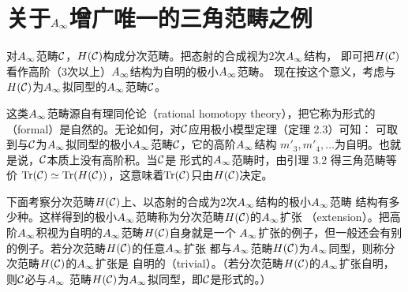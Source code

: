 
\section{关于\texorpdfstring{$A_{\infty}$}{A∞}增广唯一的三角范畴之例}
\label{sec:c06}

对$A_{\infty}$范畴$\mathcal{C}$，$H(\mathcal{C})$构成分次范畴。把态射的合成视为$2$次$A_{\infty}$结构，
即可把$H(\mathcal{C})$看作高阶（$3$次以上）$A_{\infty}$结构为自明的极小$A_{\infty}$范畴。
现在按这个意义，考虑与$H(\mathcal{C})$为$A_{\infty}$拟同型的$A_{\infty}$范畴$\mathcal{C}$。

这类$A_{\infty}$范畴源自有理同伦论（rational homotopy theory），把它称为形式的
（formal）是自然的。无论如何，对$\mathcal{C}$应用极小模型定理（定理 2.3）可知：
可取到与$\mathcal{C}$为$A_{\infty}$拟同型的极小$A_{\infty}$范畴$\mathcal{C}$，它的高阶$A_{\infty}$结构
$m'_{3},m'_{4},\dots$为自明。也就是说，$\mathcal{C}$本质上没有高阶积。当$\mathcal{C}$是
形式的$A_{\infty}$范畴时，由引理 3.2 得三角范畴等价
$\operatorname{Tr}(\mathcal{C})\simeq\operatorname{Tr}(H(\mathcal{C}))$，这意味着$\operatorname{Tr}(\mathcal{C})$只由$H(\mathcal{C})$决定。


下面考察分次范畴$H(\mathcal{C})$上、以态射的合成为$2$次$A_{\infty}$结构的极小$A_{\infty}$范畴
结构有多少种。这样得到的极小$A_{\infty}$范畴称为分次范畴$H(\mathcal{C})$的$A_{\infty}$扩张
（extension）。把高阶$A_{\infty}$积视为自明的$A_{\infty}$范畴$H(\mathcal{C})$自身就是一个
$A_{\infty}$扩张的例子，但一般还会有别的例子。若分次范畴$H(\mathcal{C})$的任意$A_{\infty}$扩张
都与$A_{\infty}$范畴$H(\mathcal{C})$为$A_{\infty}$同型，则称分次范畴$H(\mathcal{C})$的$A_{\infty}$扩张是
自明的（trivial）。（若分次范畴$H(\mathcal{C})$的$A_{\infty}$扩张自明，则$\mathcal{C}$必与$A_{\infty}$
范畴$H(\mathcal{C})$为$A_{\infty}$拟同型，即$\mathcal{C}$是形式的。）



